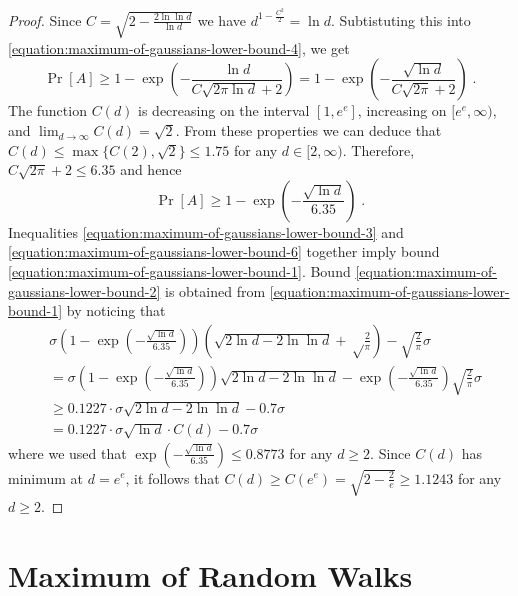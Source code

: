 \documentclass{article}
\begin{document}
\begin{proof}
Since $C = \sqrt{2 - \frac{2 \ln \ln d}{\ln d}}$ we have $d^{1-\frac{C^2}{2}} = \ln d$. Subtistuting this into \eqref{equation:maximum-of-gaussians-lower-bound-4}, we get
\begin{equation}
\label{equation-maximum-of-gaussians-lower-bound-5}
\Pr[A] \ge 1 - \exp\left(-\frac{\ln d}{C \sqrt{2\pi \ln d}+2}\right) = 1 - \exp\left(-\frac{\sqrt{\ln d}}{C \sqrt{2\pi}+2}\right) \; .
\end{equation}
The function $C(d)$ is decreasing on the interval $[1,e^e]$, increasing on $[e^e, \infty)$, and $\lim_{d \to \infty} C(d) = \sqrt{2}$. From these properties
we can deduce that $C(d) \le \max\{C(2), \sqrt{2}\} \le 1.75$ for any $d \in [2,\infty)$. Therefore, $C\sqrt{2 \pi} + 2 \le 6.35$ and hence
\begin{equation}
\label{equation:maximum-of-gaussians-lower-bound-6}
\Pr[A] \ge 1 - \exp\left(-\frac{\sqrt{\ln d}}{6.35}\right) \; .
\end{equation}
Inequalities \eqref{equation:maximum-of-gaussians-lower-bound-3} and \eqref{equation:maximum-of-gaussians-lower-bound-6} together imply bound \eqref{equation:maximum-of-gaussians-lower-bound-1}.
Bound \eqref{equation:maximum-of-gaussians-lower-bound-2} is obtained from \eqref{equation:maximum-of-gaussians-lower-bound-1} by noticing that
\begin{align*}
& \sigma \left(1 - \exp\left(-\frac{\sqrt{\ln d}}{6.35}\right)\right) \left(\sqrt{2 \ln d - 2 \ln \ln d} +\sqrt\frac{2}{\pi}\right) -\sqrt{\frac{2}{\pi}} \sigma \\
& = \sigma \left(1 - \exp\left(-\frac{\sqrt{\ln d}}{6.35}\right)\right) \sqrt{2 \ln d - 2 \ln \ln d} - \exp\left(-\frac{\sqrt{\ln d}}{6.35}\right) \sqrt{\frac{2}{\pi}} \sigma \\
& \ge 0.1227 \cdot \sigma \sqrt{2 \ln d - 2 \ln \ln d} - 0.7 \sigma \\
& = 0.1227 \cdot \sigma \sqrt{\ln d} \cdot C(d) - 0.7 \sigma
\end{align*}
where we used that $\exp\left(-\frac{\sqrt{\ln d}}{6.35}\right) \le 0.8773$ for any $d \ge 2$.
Since $C(d)$ has minimum at $d = e^e$, it follows that $C(d) \ge C(e^e) = \sqrt{2 - \frac{2}{e}} \ge 1.1243$ for any $d \ge 2$.
\end{proof}

\section{Maximum of Random Walks}
\label{section:maximum-of-random-walks}
\end{document}
